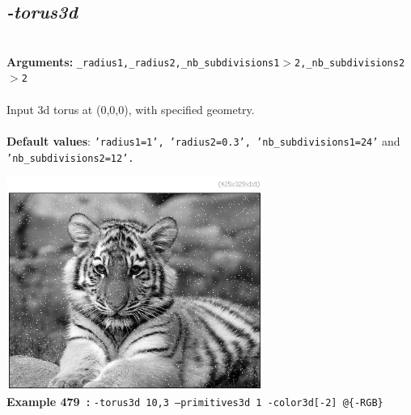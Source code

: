 \documentclass[a4paper,11pt,twoside]{book}
\begin{document}
\subsection{\emph{-torus3d} }\vspace*{-0.5em}
~\\\textbf{Arguments: } 
{\small \texttt{\_radius1,\_radius2,\_nb\_subdivisions1$>$2,\_nb\_subdivisions2$>$2}}\\~\\
Input 3d torus at (0,0,0), with specified geometry.
~\\~\\\textbf{Default values}: {\small \texttt{'radius1=1', 'radius2=0.3', 'nb\_subdivisions1=24'} and \texttt{'nb\_subdivisions2=12'.}}
\begin{center}\includegraphics[keepaspectratio=true,height=7cm,width=\textwidth]{img/gmic_def479.jpg}\\
{\footnotesize \textbf{Example 479~:} \texttt{-torus3d 10,3 --primitives3d 1 -color3d[-2] @\{-RGB\}}}
\end{center}
\end{document}
